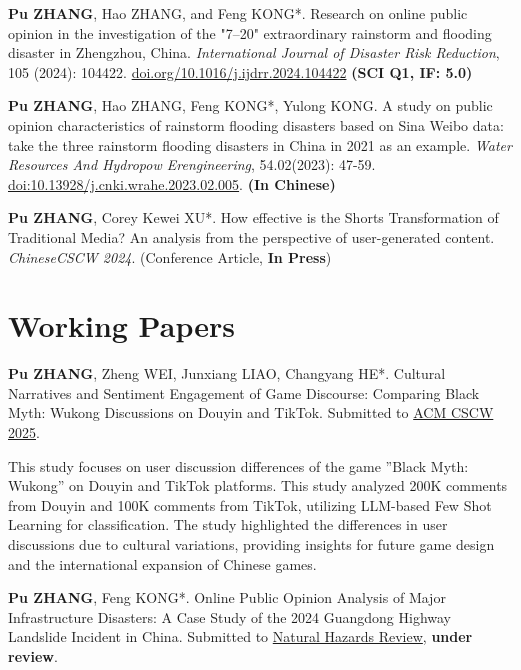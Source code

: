 \documentclass[letterpaper, 11pt]{article}
\begin{document}
\vspace{0.5em}
\textbf{Pu ZHANG}, Hao ZHANG, and Feng KONG*. Research on online public opinion in the investigation of the "7–20" extraordinary rainstorm and flooding disaster in Zhengzhou, China. \textit{International Journal of Disaster Risk Reduction}, {105 (2024): 104422.} \href{https://doi.org/10.1016/j.ijdrr.2024.104422}{doi.org/10.1016/j.ijdrr.2024.104422} \textbf{(SCI Q1, IF: 5.0)}    

\vspace{0.5em}
\textbf{Pu ZHANG}, Hao ZHANG, Feng KONG*, Yulong KONG. {A study on public opinion characteristics of rainstorm flooding disasters based on Sina Weibo data: take the three rainstorm flooding disasters in China in 2021 as an example}. \textit{Water Resources And Hydropow Erengineering}, {54.02(2023): 47-59}. \href{https://doi.org/10.13928/j.cnki.wrahe.2023.02.005}{doi:10.13928/j.cnki.wrahe.2023.02.005}. \textbf{(In Chinese)}

\vspace{0.5em}
\textbf{Pu ZHANG}, Corey Kewei XU*. How effective is the Shorts Transformation of Traditional Media? An analysis from the perspective of user-generated content. \textit{ChineseCSCW 2024}. (Conference Article, \textbf{In Press})

\section{Working Papers}
\textbf{Pu ZHANG}, Zheng WEI, Junxiang LIAO, Changyang HE*. Cultural Narratives and Sentiment Engagement of Game Discourse: Comparing Black Myth: Wukong Discussions on Douyin and TikTok. Submitted to \href{https://cscw.acm.org/2025/}{ACM CSCW 2025}.

This study focuses on user discussion differences of the game ''Black Myth: Wukong'' on Douyin and TikTok platforms. This study analyzed 200K comments from Douyin and 100K comments from TikTok, utilizing LLM-based Few Shot Learning for classification. The study highlighted the differences in user discussions due to cultural variations, providing insights for future game design and the international expansion of Chinese games.

\vspace{0.5em}
\textbf{Pu ZHANG}, Feng KONG*. Online Public Opinion Analysis of Major Infrastructure Disasters: A Case Study of the 2024 Guangdong Highway Landslide Incident in China. Submitted to \href{https://ascelibrary.org/journal/nhrefo}{Natural Hazards Review}, \textbf{under review}.
\end{document}
